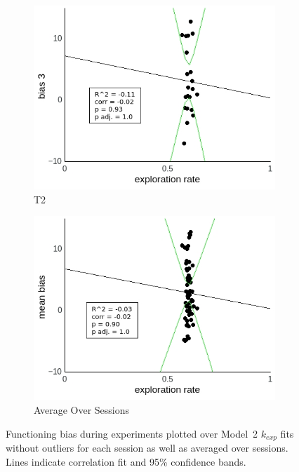 \documentclass[a4paper]{scrreprt}
\begin{document}
\begin{figure}
\begin{subfigure}[b]{0.49\textwidth}
        \includegraphics[width=\textwidth]{figs/sec3/temp/tempno_diff_3_mod2dat.jpeg}
        \caption{T2}
    \end{subfigure}
    \begin{subfigure}[b]{0.49\textwidth}
        \includegraphics[width=\textwidth]{figs/sec3/temp/tempno_diff_mean_mod2dat.jpeg}
        \caption{Average Over Sessions}
    \end{subfigure}
\caption{Functioning bias during experiments plotted over Model~2 $k_{exp}$ fits without outliers for each session as well as averaged over sessions. Lines indicate correlation fit and 95\% confidence bands.}
\label{fig:tempno_diff_mod2dat}
\end{figure}
\end{document}
